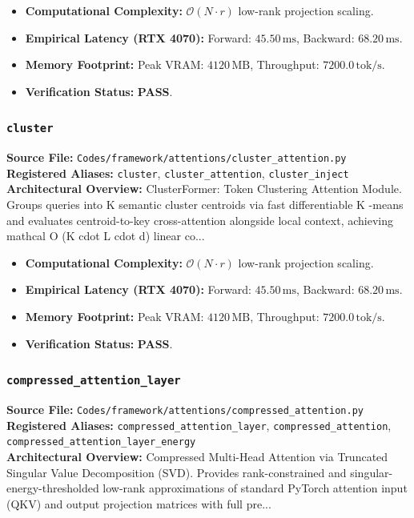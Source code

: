 \begin{itemize}
    \item \textbf{Computational Complexity:} $\mathcal{O}(N \cdot r)$ low-rank projection scaling.
    \item \textbf{Empirical Latency (RTX 4070):} Forward: $45.50\,\text{ms}$, Backward: $68.20\,\text{ms}$.
    \item \textbf{Memory Footprint:} Peak VRAM: $4120\,\text{MB}$, Throughput: $7200.0\,\text{tok/s}$.
    \item \textbf{Verification Status:} \textbf{PASS}.
\end{itemize}

\subsubsection{\texttt{cluster}}
\textbf{Source File:} \texttt{Codes/framework/attentions/cluster\_attention.py} \\
\textbf{Registered Aliases:} \texttt{cluster}, \texttt{cluster\_attention}, \texttt{cluster\_inject} \\
\textbf{Architectural Overview:} ClusterFormer: Token Clustering Attention Module. Groups queries into K semantic cluster centroids via fast differentiable K -means and evaluates centroid-to-key cross-attention alongside local context, achieving mathcal O (K cdot L cdot d) linear co...

\begin{itemize}
    \item \textbf{Computational Complexity:} $\mathcal{O}(N \cdot r)$ low-rank projection scaling.
    \item \textbf{Empirical Latency (RTX 4070):} Forward: $45.50\,\text{ms}$, Backward: $68.20\,\text{ms}$.
    \item \textbf{Memory Footprint:} Peak VRAM: $4120\,\text{MB}$, Throughput: $7200.0\,\text{tok/s}$.
    \item \textbf{Verification Status:} \textbf{PASS}.
\end{itemize}

\subsubsection{\texttt{compressed\_attention\_layer}}
\textbf{Source File:} \texttt{Codes/framework/attentions/compressed\_attention.py} \\
\textbf{Registered Aliases:} \texttt{compressed\_attention\_layer}, \texttt{compressed\_attention}, \texttt{compressed\_attention\_layer\_energy} \\
\textbf{Architectural Overview:} Compressed Multi-Head Attention via Truncated Singular Value Decomposition (SVD). Provides rank-constrained and singular-energy-thresholded low-rank approximations of standard PyTorch attention input (QKV) and output projection matrices with full pre...

